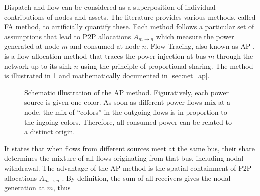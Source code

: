 \documentclass[11pt,twocolumn]{article}
\begin{document}
Dispatch and flow can be considered as a superposition of individual contributions of nodes and assets. The literature provides various methods, called \ac{FA} method, to artificially quantify these. Each method follows a particular set of assumptions that lead to \ac{P2P} allocations $A_{m \rightarrow n}$ which measure the power generated at node $m$ and consumed at node $n$. Flow Tracing, also known as \ac{AP} \cite{bialek_tracing_1996}, is a flow allocation method that traces the power injection at bus $m$ through the network up to its sink $n$ using the principle of proportional sharing. The method is illustrated in \cref{fig:ap-scheme} and mathematically documented in \cref{sec:net_ap}.
\begin{figure}
    \centering
    \caption{Schematic illustration of the \ac{AP} method. Figuratively, each power source is given one color. As soon as different power flows mix at a node, the mix of ``colors'' in the outgoing flows is in proportion to the ingoing colors. Therefore, all consumed power can be related to a distinct origin.}
    \label{fig:ap-scheme}
\end{figure}
It states that when flows from different sources meet at the same bus, their share determines the mixture of all flows originating from that bus, including nodal withdrawal. The advantage of the \ac{AP} method is the spatial containment of \ac{P2P} allocations $A_{m \rightarrow n}$ \cite{hofmann_techno-economic_2020}. By definition, the sum of all receivers gives the nodal generation at $m$, thus
\end{document}
